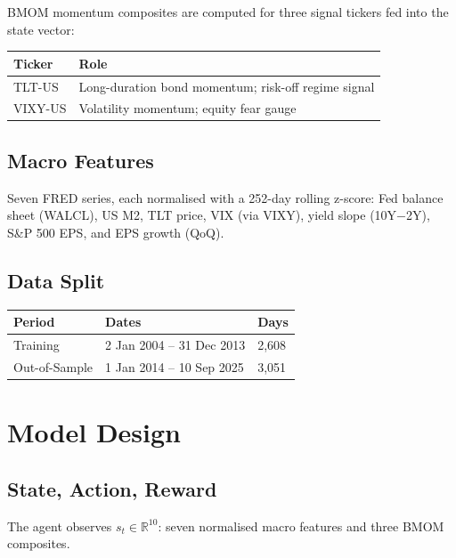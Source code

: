 \documentclass[11pt, a4paper]{article}
\begin{document}
BMOM momentum composites are computed for three signal tickers fed into the state vector:

\begin{center}
\begin{tabular}{ll}
\toprule
\textbf{Ticker} & \textbf{Role} \\
\midrule
TLT-US  & Long-duration bond momentum; risk-off regime signal \\
VIXY-US & Volatility momentum; equity fear gauge \\
\bottomrule
\end{tabular}
\end{center}

\subsection{Macro Features}

Seven FRED series, each normalised with a 252-day rolling z-score: Fed balance sheet (WALCL), US M2, TLT price, VIX (via VIXY), yield slope (10Y$-$2Y), S\&P 500 EPS, and EPS growth (QoQ).

\subsection{Data Split}

\begin{center}
\begin{tabular}{lll}
\toprule
\textbf{Period} & \textbf{Dates} & \textbf{Days} \\
\midrule
Training        & 2 Jan 2004 -- 31 Dec 2013  & 2,608 \\
Out-of-Sample   & 1 Jan 2014 -- 10 Sep 2025  & 3,051 \\
\bottomrule
\end{tabular}
\end{center}

\section{Model Design}

\subsection{State, Action, Reward}

The agent observes $s_t \in \mathbb{R}^{10}$: seven normalised macro features and three BMOM composites.
\end{document}
